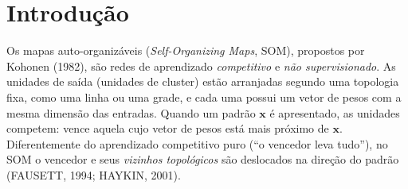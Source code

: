 \documentclass[12pt,a4paper,oneside]{article}
\begin{document}
\fazcapa
\fazfolhaderosto

\begin{center}
  {\bfseries\MakeUppercase{\TituloTexto}}
\end{center}

\begin{abstract}
\noindent Este trabalho resolve o Exercício 4.1 de Fausett (1994):
uma rede de Kohonen com duas entradas e 50 unidades de cluster dispostas em
linha é treinada com 100 pontos uniformemente distribuídos no disco
$x_1^2+x_2^2<0{,}25$, usando vizinhança fixa de raio $R=1$ e taxa de
aprendizado decrescendo linearmente de $0{,}5$ a $0{,}01$ em 100 épocas.
A implementação foi feita em Python e NumPy, sem bibliotecas de SOM prontas.
Em dez épocas o emaranhado aleatório inicial (209 cruzamentos da cadeia) é
recolhido para dentro do disco e a cadeia de pesos passa a serpentear pela
região dos dados; o erro de quantização médio cai de $0{,}140$ para $0{,}042$.
Com $R=1$ fixo, porém, restam alguns cruzamentos (``nós'') que a rede não
consegue desfazer. Análises complementares mostram que o tipo de decaimento
de $\alpha$ pouco altera o resultado, que a quantidade de nós depende da
inicialização e que um raio inicial grande elimina os nós por completo.

\medskip
\noindent\textbf{Palavras-chave:} mapas auto-organizáveis; Kohonen;
aprendizado competitivo; preservação topológica.
\end{abstract}

\section{Introdução}

Os mapas auto-organizáveis (\textit{Self-Organizing Maps}, SOM), propostos
por Kohonen (1982), são redes de aprendizado \emph{competitivo} e
\emph{não supervisionado}. As unidades de saída (unidades de cluster) estão
arranjadas segundo uma topologia fixa, como uma linha ou uma grade, e cada
uma possui um vetor de pesos com a mesma dimensão das entradas. Quando um
padrão $\mathbf{x}$ é apresentado, as unidades competem: vence aquela cujo
vetor de pesos está mais próximo de $\mathbf{x}$. Diferentemente do
aprendizado competitivo puro (``o vencedor leva tudo''), no SOM o vencedor e
seus \emph{vizinhos topológicos} são deslocados na direção do padrão
(FAUSETT, 1994; HAYKIN, 2001).
\end{document}

